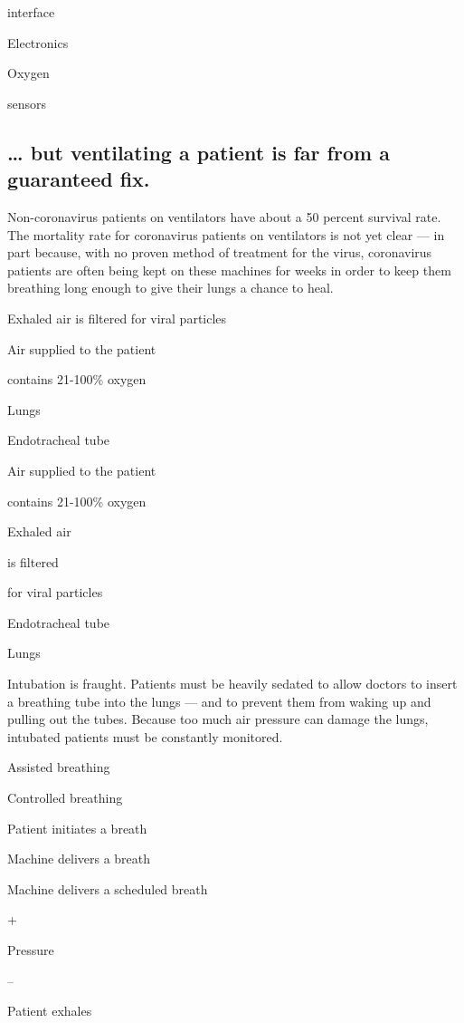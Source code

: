 interface

Electronics

Oxygen

sensors

\hypertarget{-but-ventilating-a-patient-is-far-from-a-guaranteed-fix}{%
\subsection{\ldots{} but ventilating a patient is far from a guaranteed
fix.}\label{-but-ventilating-a-patient-is-far-from-a-guaranteed-fix}}

Non-coronavirus patients on ventilators have about a 50 percent survival
rate. The mortality rate for coronavirus patients on ventilators is not
yet clear --- in part because, with no proven method of treatment for
the virus, coronavirus patients are often being kept on these machines
for weeks in order to keep them breathing long enough to give their
lungs a chance to heal.

Exhaled air is filtered for viral particles

Air supplied to the patient

contains 21-100\% oxygen

Lungs

Endotracheal tube

Air supplied to the patient

contains 21-100\% oxygen

Exhaled air

is filtered

for viral particles

Endotracheal tube

Lungs

Intubation is fraught. Patients must be heavily sedated to allow doctors
to insert a breathing tube into the lungs --- and to prevent them from
waking up and pulling out the tubes. Because too much air pressure can
damage the lungs, intubated patients must be constantly monitored.

Assisted breathing

Controlled breathing

Patient initiates a breath

Machine delivers a breath

Machine delivers a scheduled breath

+

Pressure

--

Patient exhales

